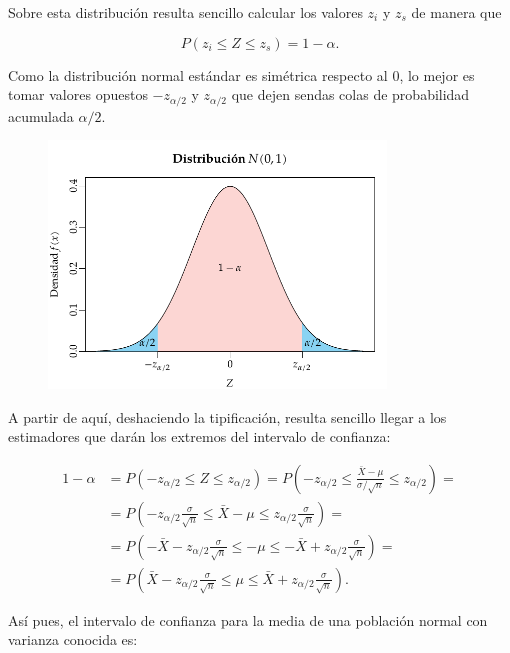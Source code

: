 \documentclass[
  a4paper,
]{scrreport}
\theoremstyle{plain}
\theoremstyle{definition}
\theoremstyle{definition}
\theoremstyle{remark}
\begin{document}
Sobre esta distribución resulta sencillo calcular los valores \(z_i\) y
\(z_s\) de manera que

\[
P(z_i\leq Z \leq z_s) = 1-\alpha.
\]

Como la distribución normal estándar es simétrica respecto al 0, lo
mejor es tomar valores opuestos \(-z_{\alpha/2}\) y \(z_{\alpha/2}\) que
dejen sendas colas de probabilidad acumulada \(\alpha/2\).

\begin{figure}

{\centering \includegraphics[width=0.8\textwidth,height=\textheight]{img/estimacion/extremos-intervalo-media-normal.pdf}

}

\end{figure}

A partir de aquí, deshaciendo la tipificación, resulta sencillo llegar a
los estimadores que darán los extremos del intervalo de confianza:

\begin{align*}
1-\alpha &= P(-z_{\alpha/2}\leq Z \leq z_{\alpha/2}) = P\left(-z_{\alpha/2}\leq \frac{\bar X -\mu}{\sigma/\sqrt{n}} \leq z_{\alpha/2}\right) =\\
&= P\left(-z_{\alpha/2}\frac{\sigma}{\sqrt{n}}\leq \bar X -\mu \leq z_{\alpha/2}\frac{\sigma}{\sqrt{n}}\right)=\\
&= P\left(-\bar{X}-z_{\alpha/2}\frac{\sigma}{\sqrt{n}}\leq -\mu \leq -\bar{X}+z_{\alpha/2}\frac{\sigma}{\sqrt{n}}\right)= \\
&= P\left(\bar{X}-z_{\alpha/2}\frac{\sigma}{\sqrt{n}}\leq \mu \leq \bar{X}+z_{\alpha/2}\frac{\sigma}{\sqrt{n}}\right).
\end{align*}

Así pues, el intervalo de confianza para la media de una población
normal con varianza conocida es:
\end{document}
